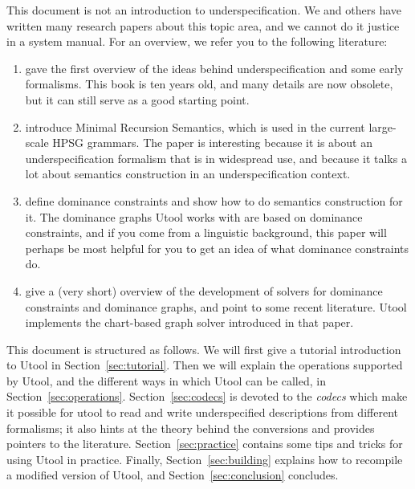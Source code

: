 This document is not an introduction to underspecification. We and
others have written many research papers about this topic area, and we
cannot do it justice in a system manual. For an overview, we refer you
to the following literature:
\begin{enumerate}
\item {} gave the first overview of the ideas
behind underspecification and some early formalisms. This book is ten
years old, and many details are now obsolete, but it can still serve
as a good starting point.
\item {} introduce Minimal Recursion Semantics, which
is used in the current large-scale HPSG grammars. The paper is
interesting because it is about an underspecification formalism that
is in widespread use, and because it talks a lot about semantics
construction in an underspecification context.
\item {} define dominance constraints and show how to do
semantics construction for it. The dominance graphs Utool works with
are based on dominance constraints, and if you come from a linguistic
background, this paper will perhaps be most helpful for you to get an
idea of what dominance constraints do.
\item {} give a (very short) overview of the
development of solvers for dominance constraints and dominance graphs,
and point to some recent literature. Utool implements the chart-based
graph solver introduced in that paper.
\end{enumerate}


This document is structured as follows. We will first give a tutorial
introduction to Utool in Section~\ref{sec:tutorial}. Then we will
explain the operations supported by Utool, and the different ways in
which Utool can be called, in
Section~\ref{sec:operations}. Section~\ref{sec:codecs} is devoted to
the \emph{codecs} which make it possible for utool to read and write
underspecified descriptions from different formalisms; it also hints
at the theory behind the conversions and provides pointers to the
literature. Section~\ref{sec:practice} contains some tips and tricks
for using Utool in practice. Finally, Section~\ref{sec:building}
explains how to recompile a modified version of Utool, and
Section~\ref{sec:conclusion} concludes.

